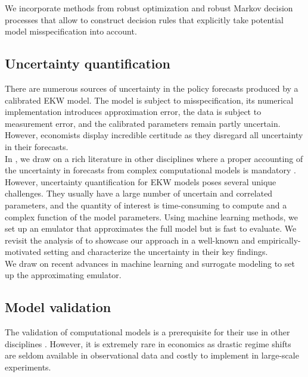 \noindent We incorporate methods from robust optimization \citep{Ben-Tal.2009, Rahimian.2019, Wiesemann.2014} and robust Markov decision processes \citep{Iyengar.2005, Nilim.2005} that allow to construct decision rules that explicitly take potential model misspecification into account.
\subsection{Uncertainty quantification}
There are numerous sources of uncertainty in the policy forecasts produced by a calibrated EKW model. The model is subject to misspecification, its numerical implementation introduces approximation error, the data is subject to measurement error, and the calibrated parameters remain partly uncertain. However, economists display incredible certitude as they disregard all uncertainty \citep{Manski.2013} in their forecasts.\\

\noindent In \citet{Gabler.2020b}, we draw on a rich literature in other disciplines where a proper accounting of the uncertainty in forecasts from complex computational models is mandatory \citep{Saltelli.2004, Saltelli.2008, Smith.2014}. However, uncertainty quantification for EKW models poses several unique challenges. They usually have a large number of uncertain and correlated parameters, and the quantity of interest is time-consuming to compute and a complex function of the model parameters. Using machine learning methods, we set up an emulator that approximates the full model but is fast to evaluate. We revisit the analysis of \citep{Keane.1994, Keane.1997} to showcase our approach in a well-known and empirically-motivated setting and characterize the uncertainty in their key findings.\\

\noindent We draw on recent advances in machine learning \citep{Hastie.2008, Murphy.2012} and surrogate modeling \citep{Forrester.2008} to set up the approximating emulator.
\subsection{Model validation}
The validation of computational models is a prerequisite for their use in other disciplines \citep{Adams.2012, Oberkampf.2010}. However, it is extremely rare in economics as drastic regime shifts are seldom available in observational data and costly to implement in large-scale experiments.\\


